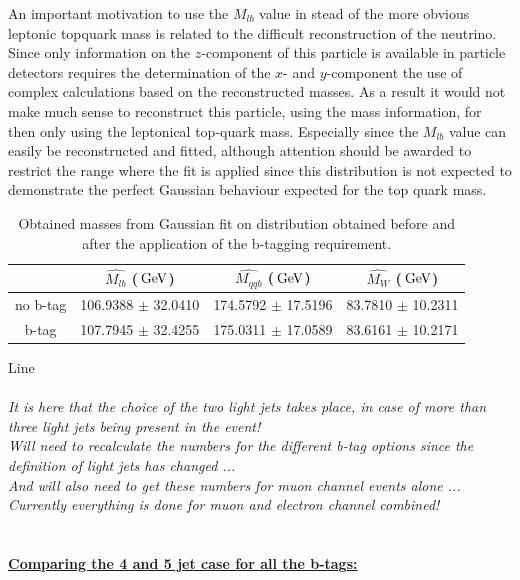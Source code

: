 An important motivation to use the $M_{lb}$ value in stead of the more obvious leptonic topquark mass is related to the difficult reconstruction of the neutrino.
Since only information on the $z$-component of this particle is available in particle detectors requires the determination of the $x$- and $y$-component the use of complex calculations based on the reconstructed masses. As a result it would not make much sense to reconstruct this particle, using the mass information, for then only using the leptonical top-quark mass. Especially since the $M_{lb}$ value can easily be reconstructed and fitted, although attention should be awarded to restrict the range where the fit is applied since this distribution is not expected to demonstrate the perfect Gaussian behaviour expected for the top quark mass.

\begin{table}[h!t]
 \centering
 \begin{tabular}{c|c|c|c}
		& $\hat{M_{lb}}$ ($\, \mathrm{GeV}$) 	& $\hat{M_{qqb}}$ ($\, \mathrm{GeV}$) 	& $\hat{M_{W}}$ ($\, \mathrm{GeV}$) 	\\
  \hline
  no b-tag 	& 106.9388 $\pm$ 32.0410 	& 174.5792 $\pm$ 17.5196 	& 83.7810 $\pm$ 10.2311 	\\
  b-tag 	& 107.7945 $\pm$ 32.4255 	& 175.0311 $\pm$ 17.0589 	& 83.6161 $\pm$ 10.2171 	
 \end{tabular}
 \caption{Obtained masses from Gaussian fit on distribution obtained before and after the application of the b-tagging requirement.}
\end{table}

Line
\\
\\
\textit{It is here that the choice of the two light jets takes place, in case of more than three light jets being present in the event!}\\
\textit{Will need to recalculate the numbers for the different b-tag options since the definition of light jets has changed ...} \\
\textit{And will also need to get these numbers for muon channel events alone ... Currently everything is done for muon and electron channel combined!}
\\
\\
\newpage
\paragraph{\underline{Comparing the 4 and 5 jet case for all the b-tags:}}
